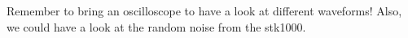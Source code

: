 

Remember to bring an oscilloscope to have a look at different waveforms! Also, we could have a look at the random noise from the stk1000.

